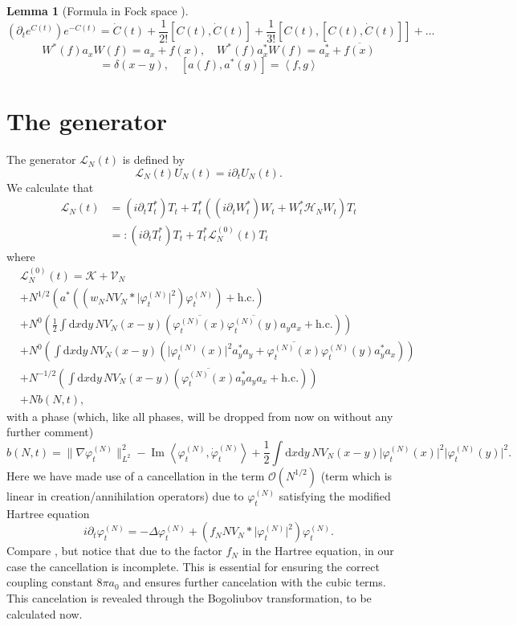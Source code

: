\documentclass[11pt,a4paper,twoside,headsepline]{scrartcl}
\newtheorem{lem}[thm]{Lemma}
\newcommand{\di}{\textrm{d}}		%
\newcommand{\Lcal}{\mathcal{L}}		%
\newcommand{\Kcal}{\mathcal{K}}		%
\newcommand{\Vcal}{\mathcal{V}}		%
\newcommand{\Hcal}{\mathcal{H}}		%
\newcommand{\Ocal}{\mathcal{O}}		%
\newcommand{\hc}{\mbox{h.c.}}		%
\newcommand{\scal}[2]{\left<#1,#2\right>} %
\newcommand{\cc}[1]{\overline{#1}}	%
\renewcommand{\Im}{\operatorname{Im}} 	%
\newcommand{\norm}[1]{\lVert#1\rVert}	%
\newcommand{\ph}{\varphi_t^{(N)}}	%
\newcommand{\phdot}{\dot{\varphi}_t^{(N)}}	%
\newcommand{\bd}{\begin{displaymath}}			%
\newcommand{\ed}{\end{displaymath}}
\begin{document}
\begin{lem}[Formula in Fock space \cite{RS2009}]
 \bd
\left(\partial_t e^{C(t)} \right) e^{-C(t)} = \dot C(t) + \frac{1}{2!}[C(t),\dot C(t)]+ \frac{1}{3!}[C(t),[C(t),\dot C(t)]] + \dots
 \ed
\bd
 W^*(f) a_x W(f) = a_x + f(x), \quad W^*(f)a^*_x W(f) = a^*_x + \cc{f(x)}
\ed
\bd
[a_x,a^*_y] = \delta(x-y), \quad [a(f),a^*(g)] = \scal{f}{g}
\ed
\end{lem}

\section{The generator}
The generator $\Lcal_N(t)$ is defined by
\bd
\Lcal_N(t) U_N(t) = i \partial_t U_N(t).
\ed
We calculate that
\begin{align*}
\Lcal_N(t) 	& = (i \partial_t T^*_t) T_t + T^*_t \left( (i \partial_t W^*_t) W_t + W^*_t \Hcal_N W_t \right) T_t \\
		& =: (i \partial_t T^*_t) T_t + T^*_t \Lcal^{(0)}_N(t) T_t
\end{align*}
where
\begin{align*}
& \Lcal^{(0)}_N(t) = \Kcal + \Vcal_N \\
		& + N^{1/2} \left(  a^*\left( (w_N N V_N \ast \lvert \ph \rvert^2)\ph \right) + \hc  \right) \\
		& + N^0	    \left(  \frac{1}{2}\int \di x \di y\, NV_N(x-y)\left( \cc{\ph(x)} \cc{\ph(y)} a_y a_x + \hc \right) \right) \\
		& + N^0	    \left(  \int \di x \di y\, NV_N(x-y)\left( \lvert \ph(x) \rvert^2 a^*_y a_y + \cc{\ph(x)} \ph(y) a^*_y a_x \right) \right) \\
		& + N^{-1/2}\left(  \int \di x \di y\, NV_N(x-y) \left( \cc{\ph(x)} a^*_y a_y a_x + \hc \right)  \right) \\
		& + N b(N,t),
\end{align*}
with a phase (which, like all phases, will be dropped from now on without any further comment)
\bd
b(N,t) = \norm{\nabla \ph}_{L^2}^2 - \Im \scal{\ph}{\phdot} + \frac{1}{2}\int \di x \di y\, NV_N(x-y) \lvert \ph(x)\rvert^2 \lvert \ph(y) \rvert^2.
\ed
Here we have made use of a cancellation in the term $\Ocal({N^{1/2}})$ (term which is linear in creation/annihilation operators) due to $\ph$ satisfying the modified Hartree equation
\bd
i\partial_t \ph = -\Delta \ph + \left(f_N N V_N \ast \lvert \ph \rvert^2 \right) \ph.
\ed
Compare \cite{RS2009}, but notice that due to the factor $f_N$ in the Hartree equation, in our case the cancellation is incomplete. This is essential for ensuring the correct coupling constant $8\pi a_0$ and ensures further cancelation with the cubic terms. This cancelation is revealed through the Bogoliubov transformation, to be calculated now.
\end{document}
